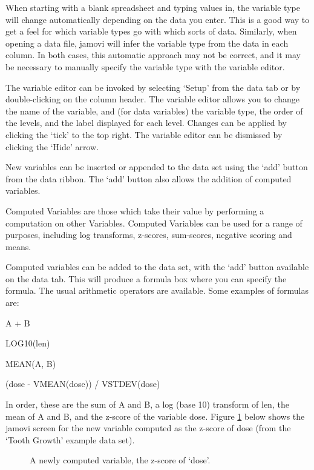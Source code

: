 When starting with a blank spreadsheet and typing values in, the variable type will change automatically depending on the data you enter. This is a good way to get a feel for which variable types go with which sorts of data. Similarly, when opening a data file, jamovi will infer the variable type from the data in each column. In both cases, this automatic approach may not be correct, and it may be necessary to manually specify the variable type with the variable editor.

The variable editor can be invoked by selecting ‘Setup’ from the data tab or by double-clicking on the column header. The variable editor allows you to change the name of the variable, and (for data variables) the variable type, the order of the levels, and the label displayed for each level. Changes can be applied by clicking the ‘tick’ to the top right. The variable editor can be dismissed by clicking the `Hide' arrow.

New variables can be inserted or appended to the data set using the ‘add’ button from the data ribbon. The ‘add’ button also allows the addition of computed variables.



Computed Variables are those which take their value by performing a computation on other Variables. Computed Variables can be used for a range of purposes, including log transforms, z-scores, sum-scores, negative scoring and means.

Computed variables can be added to the data set, with the ‘add’ button available on the data tab. This will produce a formula box where you can specify the formula. The usual arithmetic operators are available. Some examples of formulas are:

A + B

LOG10(len)

MEAN(A, B)

(dose - VMEAN(dose)) / VSTDEV(dose)

In order, these are the sum of A and B, a log (base 10) transform of len, the mean of A and B, and the z-score of the variable dose. Figure \ref{fig:computedvariable} below shows the jamovi screen for the new variable computed as the z-score of dose (from the `Tooth Growth' example data set).

\vspace*{1cm}
\begin{figure}[h]
\begin{center}
\caption{A newly computed variable, the z-score of `dose'.}
\label{fig:computedvariable}
\end{center}
\end{figure}


